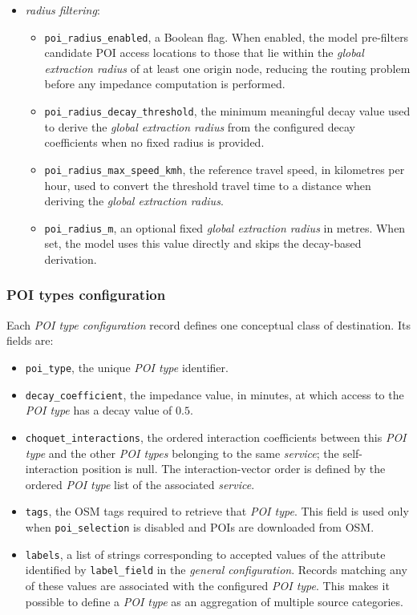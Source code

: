 \documentclass{article}
\begin{document}
\begin{itemize}
    \item \emph{radius filtering}:
    \begin{itemize}
        \item \texttt{poi\_radius\_enabled}, a Boolean flag. When enabled, the
        model pre-filters candidate POI access locations to those that lie
        within the \emph{global extraction radius} of at least one origin node,
        reducing the routing problem before any impedance computation is performed.
        \item \texttt{poi\_radius\_decay\_threshold}, the minimum meaningful decay
        value used to derive the \emph{global extraction radius} from the configured
        decay coefficients when no fixed radius is provided.
        \item \texttt{poi\_radius\_max\_speed\_kmh}, the reference travel speed, in
        kilometres per hour, used to convert the threshold travel time to a distance
        when deriving the \emph{global extraction radius}.
        \item \texttt{poi\_radius\_m}, an optional fixed \emph{global extraction
        radius} in metres. When set, the model uses this value directly and skips
        the decay-based derivation.
    \end{itemize}


\end{itemize}

\subsubsection*{POI types configuration}
Each \emph{POI type configuration} record defines one conceptual class of destination. Its fields are:
\begin{itemize}
    \item \texttt{poi\_type}, the unique \emph{POI type} identifier.
    \item \texttt{decay\_coefficient}, the impedance value, in minutes, at which access to the \emph{POI type} has a decay value of \(0.5\).
    \item \texttt{choquet\_interactions}, the ordered interaction coefficients between this \emph{POI type} and the other \emph{POI types} belonging to the same \emph{service}; the self-interaction position is null. The interaction-vector order is defined by the ordered \emph{POI type} list of the associated \emph{service}.
    \item \texttt{tags}, the OSM tags required to retrieve that \emph{POI type}. This field is used only when \texttt{poi\_selection} is disabled and POIs are downloaded from OSM.
    \item \texttt{labels}, a list of strings corresponding to accepted values of the attribute identified by \texttt{label\_field} in the \emph{general configuration}. Records matching any of these values are associated with the configured \emph{POI type}. This makes it possible to define a \emph{POI type} as an aggregation of multiple source categories.
\end{itemize}
\end{document}
